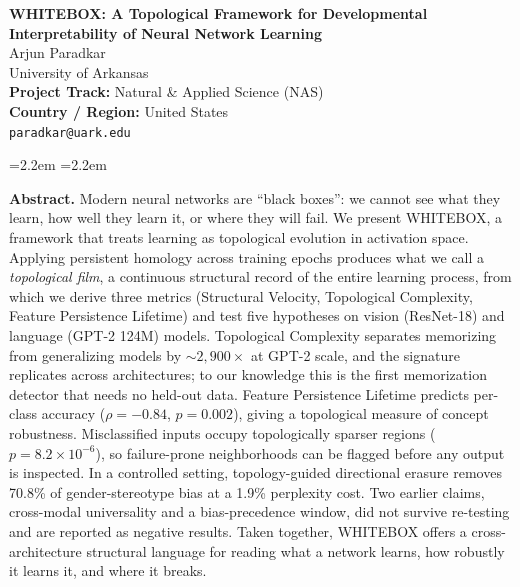 \documentclass[10pt]{article}
\begin{document}
\begin{center}
{\LARGE\bfseries WHITEBOX: A Topological Framework for Developmental\\[2pt]
Interpretability of Neural Network Learning}\\[14pt]
{\large Arjun Paradkar}\\[4pt]
University of Arkansas\\[2pt]
\textbf{Project Track:} Natural \& Applied Science (NAS)\\[2pt]
\textbf{Country / Region:} United States\\[8pt]
\texttt{paradkar@uark.edu}
\end{center}

\vspace{14pt}

\begin{list}{}{\leftmargin=2.2em \rightmargin=2.2em}
\item\relax
\textbf{Abstract.} Modern neural networks are ``black boxes'': we cannot see what they learn, how well they learn it, or where they will fail. We present WHITEBOX, a framework that treats learning as topological evolution in activation space. Applying persistent homology across training epochs produces what we call a \emph{topological film}, a continuous structural record of the entire learning process, from which we derive three metrics (Structural Velocity, Topological Complexity, Feature Persistence Lifetime) and test five hypotheses on vision (ResNet-18) and language (GPT-2 124M) models. Topological Complexity separates memorizing from generalizing models by ${\sim}2{,}900\times$ at GPT-2 scale, and the signature replicates across architectures; to our knowledge this is the first memorization detector that needs no held-out data. Feature Persistence Lifetime predicts per-class accuracy ($\rho=-0.84$, $p=0.002$), giving a topological measure of concept robustness. Misclassified inputs occupy topologically sparser regions ($p=8.2\times10^{-6}$), so failure-prone neighborhoods can be flagged before any output is inspected. In a controlled setting, topology-guided directional erasure removes 70.8\% of gender-stereotype bias at a 1.9\% perplexity cost. Two earlier claims, cross-modal universality and a bias-precedence window, did not survive re-testing and are reported as negative results. Taken together, WHITEBOX offers a cross-architecture structural language for reading what a network learns, how robustly it learns it, and where it breaks.
\end{list}
\end{document}
